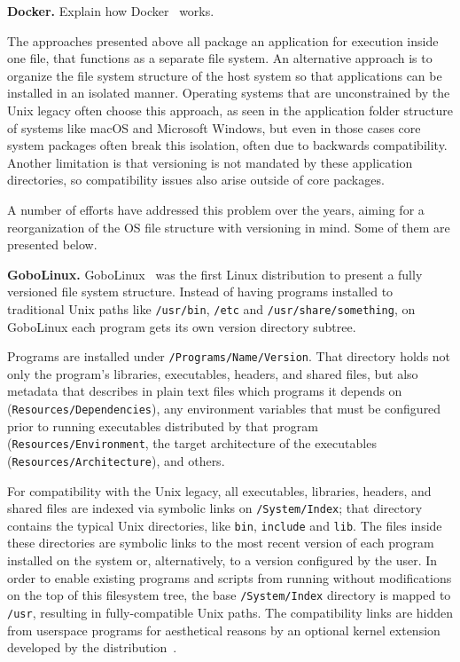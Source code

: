 \documentclass[sigplan, anonymous, 10pt]{acmart}
\begin{document}
\textbf{Docker.}
Explain how Docker~\cite{fink2014:docker} works.
\lipsum[1-2]

The approaches presented above all package an application for execution inside one file,
that functions as a separate file system. An alternative approach is to organize the
file system structure of the host system so that applications can be installed in an
isolated manner. Operating systems that are unconstrained by the Unix legacy often
choose this approach, as seen in the application folder structure of systems like
macOS and Microsoft Windows, but even in those cases core system packages often
break this isolation, often due to backwards compatibility. Another limitation is that
versioning is not mandated by these application directories, so compatibility issues
also arise outside of core packages.

A number of efforts have addressed this problem over the years, aiming for a reorganization
of the OS file structure with versioning in mind. Some of them are presented below.

\textbf{GoboLinux.}
GoboLinux~\cite{GoboLinux} was the first Linux distribution to present a fully versioned
file system structure. Instead of having programs installed to traditional Unix paths
like \texttt{/usr/bin}, \texttt{/etc} and \texttt{/usr/share/something}, on GoboLinux
each program gets its own version directory subtree.

Programs are installed under \texttt{/Programs/Name/Version}. That directory holds not
only the program's libraries, executables, headers, and shared files, but also metadata
that describes in plain text files which programs it depends on (\texttt{Resources/Dependencies}),
any environment variables that must be configured prior to running executables distributed
by that program (\texttt{Resources/Environment}, the target architecture of the executables
(\texttt{Resources/Architecture}), and others.

For compatibility with the Unix legacy, all executables, libraries, headers, and shared
files are indexed via symbolic links on \texttt{/System/Index};
that directory contains the typical Unix directories, like \texttt{bin}, \texttt{include}
and \texttt{lib}. The files inside these directories are symbolic links to the
most recent version of each program installed on the system or, alternatively, to a version
configured by the user. In order to enable existing programs and scripts from running
without modifications on the top of this filesystem tree, the base \texttt{/System/Index}
directory is mapped to \texttt{/usr}, resulting in fully-compatible Unix paths.
The compatibility links are hidden from userspace programs for aesthetical reasons
by an optional kernel extension developed by the distribution~\cite{GoboHide}.
\end{document}
